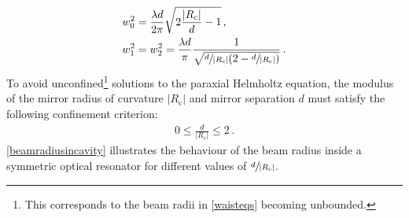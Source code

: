 \documentclass[../Thesis-IJspeert.tex]{subfiles}
\begin{document}
\begin{align}
	\label{waisteqs}
	\begin{split}
		&w_0^2 = \frac{\lambda d}{2\pi}\sqrt{2\frac{\lvert R_\mathrm{c} \rvert}{d} - 1}\,,\\
		&w_1^2 = w_2^2 = \frac{\lambda d}{\pi} \frac{1}{\sqrt{\sfrac{d}{\lvert R_\mathrm{c} \rvert}\left( 2 - \sfrac{d}{\lvert R_\mathrm{c} \rvert} \right)}}\,.
	\end{split}
\end{align}
To avoid unconfined\footnote{This corresponds to the beam radii in \autoref{waisteqs} becoming unbounded.} solutions to the paraxial Helmholtz equation, the modulus of the mirror radius of curvature $\lvert R_\mathrm{c} \rvert$ and mirror separation $d$ must satisfy the following confinement criterion:
\begin{align}
	0 \le \frac{d}{\lvert R_\mathrm{c} \rvert} \le 2\,.
\end{align}
\autoref{beamradiusincavity} illustrates the behaviour of the beam radius inside a symmetric optical resonator for different values of $\sfrac{d}{\lvert R_\mathrm{c} \rvert}$.
\end{document}

